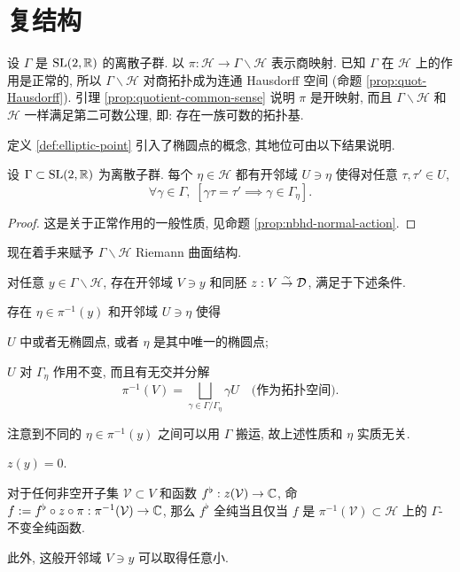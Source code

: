 \section{复结构}\label{sec:Y-charts}
设 $\Gamma$ 是 $\operatorname{SL}(2,\mathbb{R})$ 的离散子群. 以 $\pi: \mathcal{H} \to \Gamma \backslash \mathcal{H}$ 表示商映射. 已知 $\Gamma$ 在 $\mathcal{H}$ 上的作用是正常的, 所以 $\Gamma \backslash \mathcal{H}$ 对商拓扑成为连通 Hausdorff 空间 (命题 \ref{prop:quot-Hausdorff}). 引理 \ref{prop:quotient-common-sense} 说明 $\pi$ 是开映射, 而且 $\Gamma\backslash\mathcal{H}$ 和 $\mathcal{H}$ 一样满足第二可数公理, 即: 存在一族可数的拓扑基.

定义 \ref{def:elliptic-point} 引入了椭圆点的概念, 其地位可由以下结果说明.

\begin{lemma}\label{prop:nbhd-elliptic}
	设 $\Gamma \subset \operatorname{SL}(2,\mathbb{R})$ 为离散子群. 每个 $\eta \in \mathcal{H}$ 都有开邻域 $U \ni \eta$ 使得对任意 $\tau, \tau' \in U$,
	\[ \forall \gamma \in \Gamma, \; \left[ \gamma\tau=\tau' \implies \gamma \in \Gamma_\eta \right]. \]
\end{lemma}
\begin{proof}
	这是关于正常作用的一般性质, 见命题 \ref{prop:nbhd-normal-action}.
\end{proof}

现在着手来赋予 $\Gamma\backslash\mathcal{H}$ Riemann 曲面结构.
\begin{lemma}\label{prop:glueing-holomorphy}
	对任意 $y \in \Gamma \backslash \mathcal{H}$, 存在开邻域 $V \ni y$ 和同胚 $z: V \stackrel{\sim}{\rightarrow} \mathcal{D}$, 满足于下述条件.
	\begin{compactitem}
		\item 存在 $\eta \in \pi^{-1}(y)$ 和开邻域 $U \ni \eta$ 使得
		\begin{compactitem}
			\item $U$ 中或者无椭圆点, 或者 $\eta$ 是其中唯一的椭圆点;
			\item $U$ 对 $\Gamma_\eta$ 作用不变, 而且有无交并分解
			\[ \pi^{-1}(V) = \bigsqcup_{\gamma \in  \Gamma/\Gamma_{\eta}} \gamma U \quad \text{(作为拓扑空间)}. \]
		\end{compactitem}
		注意到不同的 $\eta \in \pi^{-1}(y)$ 之间可以用 $\Gamma$ 搬运, 故上述性质和 $\eta$ 实质无关.
		\item $z(y) = 0$.
		\item 对于任何非空开子集 $\mathcal{V} \subset V$ 和函数 $f^\flat: z(\mathcal{V}) \to \mathbb{C}$, 命 $f := f^\flat \circ z \circ \pi: \pi^{-1}(\mathcal{V}) \to \mathbb{C}$, 那么 $f^\flat$ 全纯当且仅当 $f$ 是 $\pi^{-1}(\mathcal{V}) \subset \mathcal{H}$ 上的 $\Gamma$-不变全纯函数.
	\end{compactitem}
	此外, 这般开邻域 $V \ni y$ 可以取得任意小.
\end{lemma}


